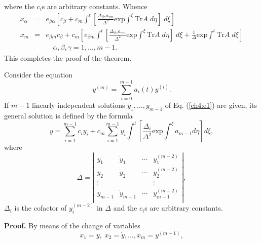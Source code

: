 where the $c_i$s are arbitrary constants.
Whence
\begin{eqnarray*}
x_{\alpha} &=& e_{\beta \alpha}\left [
 c_{\beta}+c_m\int^{t}\left [ \frac{\Delta_{\beta \gamma} 
a_{\gamma m}}{\Delta^2}\mbox{exp}\int^{\xi}\mbox{Tr} A\; d\eta 
\right ]\;d\xi \right ] \\
x_m &=& e_{\beta m}c_{\beta}+c_m \left [ 
e_{\beta m}\int^{t}\left [ \frac{\Delta_{\beta \gamma} 
a_{\gamma m}}{\Delta^2}\mbox{exp}\int^{\xi}\mbox{Tr} A\; d\eta 
\right ] \; d\xi +\frac{1}{\Delta}\mbox{exp}\int^{t}\mbox{Tr}A\;d\xi \right ]
\\
& & \quad \alpha,\beta,\gamma=1,\ldots,m-1 .
\end{eqnarray*}
This completes the proof of the theorem. 

\begin{coro}
\label{ch4:coro1}
\begin{em}
Consider the equation
\begin{equation}
y^{(m)}=\sum^{m-1}_{i=0}a_i(t)y^{(i)}. \label{ch4:e1}
\end{equation}
If $m-1$ linearly independent solutions $y_1,\ldots ,y_{m-1}$ of Eq. 
(\ref{ch4:e1}) are given, its general solution is defined by the formula
\begin{equation}
y=\sum_{i=1}^{m-1}c_iy_i+c_m\sum_{i=1}^{m-1}y_i\int^t 
\left [\frac{\Delta_i}{\Delta^2}\mbox{exp}\int^{\xi}a_{m-1}d\eta \right ]d\xi,
\label{ch4:e2}
\end{equation} 
where
\[ \Delta=\left | \begin{array}{cccc}
y_1&\dot y_1 & \cdots & y_1^{(m-2)}\\
y_2& \dot y_2 & \cdots & y_2^{(m-2)}\\
\vdots&       &        & \vdots\\
y_{m-1}& \dot y_{m-1} & \cdots & y_{m-1}^{(m-2)}\\
\end{array} \right |,\]
$\Delta_i$ is the cofactor of $y_i^{(m-2)}$ in $\Delta$ and the $c_i$s are
arbitrary constants.
\end{em}
\end{coro}
{\bf Proof.} By means of the change of variables
\[x_1=y,\;x_2=\dot y,\ldots ,x_m=y^{(m-1)},\]
